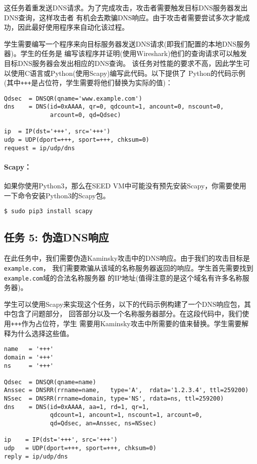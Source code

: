 这任务着重发送DNS请求。为了完成攻击，攻击者需要触发目标DNS服务器发出DNS查询，这样攻击者
有机会去欺骗DNS响应。由于攻击者需要尝试多次才能成功，因此最好使用程序来自动化该过程。

学生需要编写一个程序来向目标服务器发送DNS请求(即我们配置的本地DNS服务器)。学生的任务是
编写该程序并证明(使用Wireshark)他们的查询请求可以触发目标DNS服务器会发出相应的DNS查询。
该任务对性能的要求不高，因此学生可以使用C语言或Python(使用Scapy)编写此代码。以下提供了
Python的代码示例(其中\texttt{+++}是占位符，学生需要将他们替换为实际的值)：


\begin{lstlisting}
Qdsec  = DNSQR(qname='www.example.com')
dns    = DNS(id=0xAAAA, qr=0, qdcount=1, ancount=0, nscount=0,
             arcount=0, qd=Qdsec)

ip  = IP(dst='+++', src='+++')
udp = UDP(dport=+++, sport=+++, chksum=0)
request = ip/udp/dns
\end{lstlisting}
 

\paragraph{Scapy：} 如果你使用Python3，那么在SEED VM中可能没有预先安装Scapy，你需要使用
一下命令安装Python3的Scapy包。


\begin{lstlisting}
$ sudo pip3 install scapy
\end{lstlisting}
 

\subsection{任务 5: 伪造DNS响应}   

在此任务中，我们需要伪造Kaminsky攻击中的DNS响应。由于我们的攻击目标是\texttt{example.com}，
我们需要欺骗从该域的名称服务器返回的响应。学生首先需要找到\texttt{example.com}域的合法名称服务器
的IP地址(值得注意的是这个域名有许多名称服务器)。

学生可以使用Scapy来实现这个任务，以下的代码示例构建了一个DNS响应包，其中包含了问题部分，
回答部分以及一个名称服务器部分。在这段代码中，我们使用\texttt{+++}作为占位符，学生
需要用Kaminsky攻击中所需要的值来替换。学生需要解释为什么选择这些值。

\begin{lstlisting}
name   = '+++'  
domain = '+++'  
ns     = '+++'

Qdsec  = DNSQR(qname=name)
Anssec = DNSRR(rrname=name,   type='A',  rdata='1.2.3.4', ttl=259200)
NSsec  = DNSRR(rrname=domain, type='NS', rdata=ns, ttl=259200)
dns    = DNS(id=0xAAAA, aa=1, rd=1, qr=1,
             qdcount=1, ancount=1, nscount=1, arcount=0,
             qd=Qdsec, an=Anssec, ns=NSsec)

ip    = IP(dst='+++', src='+++')
udp   = UDP(dport=+++, sport=+++, chksum=0)
reply = ip/udp/dns
\end{lstlisting}
 

